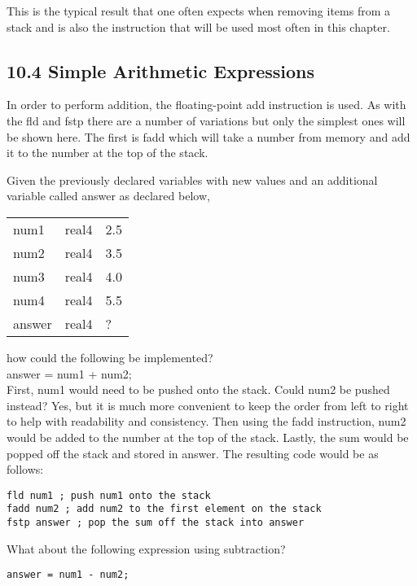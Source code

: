 \documentclass[10pt]{article}
\begin{document}
This is the typical result that one often expects when removing items from a stack and is also the instruction that will be used most often in this chapter.

\subsection*{10.4 Simple Arithmetic Expressions}
In order to perform addition, the floating-point add instruction is used. As with the fld and fstp there are a number of variations but only the simplest ones will be shown here. The first is fadd which will take a number from memory and add it to the number at the top of the stack.

Given the previously declared variables with new values and an additional variable called answer as declared below,

\begin{center}
\begin{tabular}{lll}
num1 & real4 & 2.5 \\
num2 & real4 & 3.5 \\
num3 & real4 & 4.0 \\
num4 & real4 & 5.5 \\
answer & real4 & ? \\
\end{tabular}
\end{center}

how could the following be implemented?\\
answer = num1 + num2;\\
First, num1 would need to be pushed onto the stack. Could num2 be pushed instead? Yes, but it is much more convenient to keep the order from left to right to help with readability and consistency. Then using the fadd instruction, num2 would be added to the number at the top of the stack. Lastly, the sum would be popped off the stack and stored in answer. The resulting code would be as follows:

\begin{verbatim}
fld num1 ; push num1 onto the stack
fadd num2 ; add num2 to the first element on the stack
fstp answer ; pop the sum off the stack into answer
\end{verbatim}

What about the following expression using subtraction?

\begin{verbatim}
answer = num1 - num2;
\end{verbatim}
\end{document}
